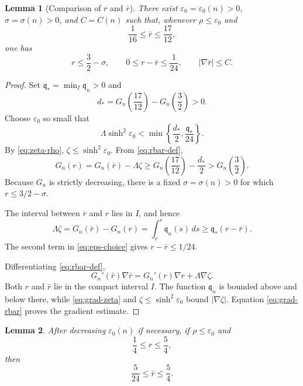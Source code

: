 \documentclass[11pt,reqno]{amsart}
\numberwithin{equation}{section}
\newtheorem{lemma}[lemma]{Lemma}
\theoremstyle{definition}
\theoremstyle{remark}
\newcommand{\eps}{\varepsilon}
\begin{document}
\begin{lemma}[Comparison of $r$ and $\bar r$]\label{lem:r-rbar}
There exist $\eps_0=\eps_0(n)>0$, $\sigma=\sigma(n)>0$, and $C=C(n)$
such that, whenever $\rho\le\eps_0$ and
\[
 \frac1{16}\le\bar r\le\frac{17}{12},
\]
one has
\begin{equation}\label{eq:r-rbar-est}
 r\le\frac32-\sigma,
 \qquad
 0\le r-\bar r\le\frac1{24},
 \qquad
 |\nabla\bar r|\le C.
\end{equation}
\end{lemma}

\begin{proof}
Set $\mathfrak q_*=\min_I\mathfrak q_n>0$ and
\[
 d_*=G_n\!\left(\frac{17}{12}\right)-G_n\!\left(\frac32\right)>0.
\]
Choose $\eps_0$ so small that
\begin{equation}\label{eq:eps-choice}
 \Lambda\sinh^2\eps_0
 <\min\left\{\frac{d_*}{2},\frac{\mathfrak q_*}{24}\right\}.
\end{equation}
By \eqref{eq:zeta-rho}, $\zeta\le\sinh^2\eps_0$.  From
\eqref{eq:rbar-def},
\[
 G_n(r)=G_n(\bar r)-\Lambda\zeta
 \ge G_n\!\left(\frac{17}{12}\right)-\frac{d_*}{2}
 >G_n\!\left(\frac32\right).
\]
Because $G_n$ is strictly decreasing, there is a fixed
$\sigma=\sigma(n)>0$ for which $r\le3/2-\sigma$.

The interval between $\bar r$ and $r$ lies in $I$, and hence
\[
 \Lambda\zeta=G_n(\bar r)-G_n(r)
 =\int_{\bar r}^{r}\mathfrak q_n(s)\,ds
 \ge \mathfrak q_*(r-\bar r).
\]
The second term in \eqref{eq:eps-choice} gives $r-\bar r\le1/24$.

Differentiating \eqref{eq:rbar-def},
\begin{equation}\label{eq:grad-rbar}
 G_n'(\bar r)\nabla\bar r
 =G_n'(r)\nabla r+\Lambda\nabla\zeta.
\end{equation}
Both $r$ and $\bar r$ lie in the compact interval $I$.  The function
$\mathfrak q_n$ is
bounded above and below there, while \eqref{eq:grad-zeta} and
$\zeta\le\sinh^2\eps_0$ bound $|\nabla\zeta|$.  Equation
\eqref{eq:grad-rbar} proves the gradient estimate.
\end{proof}

\begin{lemma}\label{lem:target-annulus}
After decreasing $\eps_0(n)$ if necessary, if $\rho\le\eps_0$ and
\[
 \frac14\le r\le\frac54,
\]
then
\begin{equation}\label{eq:rbar-target}
 \frac5{24}\le\bar r\le\frac54.
\end{equation}
\end{lemma}
\end{document}
